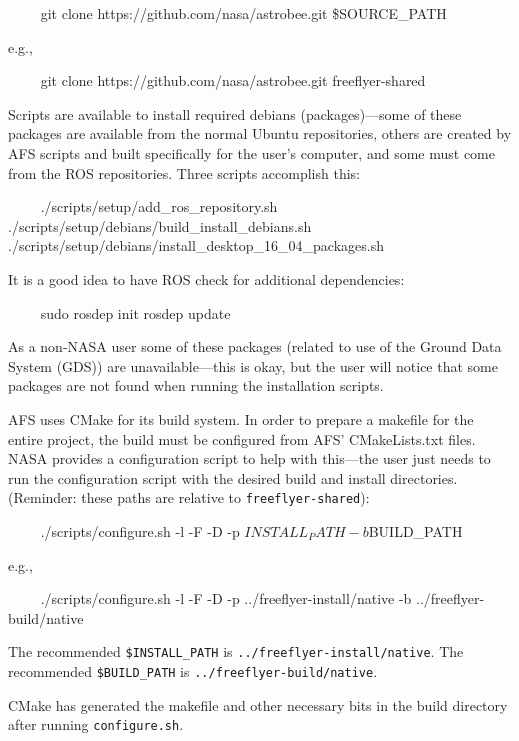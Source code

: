 \documentclass{article}
\begin{document}
\begin{markdown}
~~~~
git clone https://github.com/nasa/astrobee.git \$SOURCE_PATH
~~~~

e.g.,

~~~~
git clone https://github.com/nasa/astrobee.git freeflyer-shared
~~~~
\end{markdown}

\vspace{0.5cm}
Scripts are available to install required debians (packages)---some of these packages are available from the normal Ubuntu repositories, others are created by AFS scripts and built specifically for the user's computer, and some must come from the ROS repositories. Three scripts accomplish this:
\begin{markdown}
~~~~
./scripts/setup/add_ros_repository.sh
./scripts/setup/debians/build_install_debians.sh
./scripts/setup/debians/install_desktop_16_04_packages.sh
~~~~
\end{markdown}

It is a good idea to have ROS check for additional dependencies:
\begin{markdown}
~~~~
sudo rosdep init
rosdep update
~~~~
\end{markdown}

\noindent As a non-NASA user some of these packages (related to use of the Ground Data System (GDS)) are unavailable---this is okay, but the user will notice that some packages are not found when running the installation scripts.

AFS uses CMake for its build system. In order to prepare a makefile for the entire project, the build must be configured from AFS' CMakeLists.txt files. NASA provides a configuration script to help with this---the user just needs to run the configuration script with the desired build and install directories. (Reminder: these paths are relative to \texttt{freeflyer-shared}):
\begin{markdown}
~~~~
./scripts/configure.sh -l -F -D -p $INSTALL_PATH -b $BUILD_PATH
~~~~

e.g.,

~~~~
./scripts/configure.sh -l -F -D -p ../freeflyer-install/native
-b ../freeflyer-build/native
~~~~
\end{markdown}
\vspace{0.5cm}
The recommended \texttt{\$INSTALL\_PATH} is \texttt{../freeflyer-install/native}. The recommended \texttt{\$BUILD\_PATH} is \texttt{../freeflyer-build/native}. 

CMake has generated the makefile and other necessary bits in the build directory after running \texttt{configure.sh}.
\end{document}
